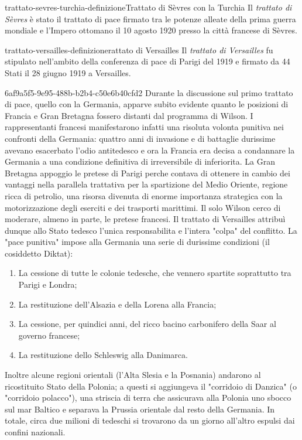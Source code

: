 \documentclass[preview]{standalone}
\begin{document}
\begin{snippetdefinition}{trattato-sevres-turchia-definizione}{Trattato di Sèvres con la Turchia}
    Il \textit{trattato di Sèvres} è stato il trattato di pace firmato
    tra le potenze alleate della prima guerra mondiale e l'Impero ottomano il
    10 agosto 1920 presso la città francese di Sèvres.
\end{snippetdefinition}

\begin{snippetdefinition}{trattato-versailles-definizione}{rattato di Versailles}
    Il \textit{trattato di Versailles} fu stipulato nell'ambito
    della conferenza di pace di Parigi del 1919 e firmato da 44
    Stati il 28 giugno 1919 a Versailles.
\end{snippetdefinition}

\begin{snippet}{6af9a5f5-9e95-488b-b2b4-c50e6b40cfd2}
    Durante la discussione sul primo trattato di pace, quello con la Germania, apparve subito
    evidente quanto le posizioni di Francia e Gran Bretagna fossero distanti dal programma di
    Wilson. I rappresentanti francesi manifestarono infatti una risoluta volonta punitiva nei
    confronti della Germania: quattro anni di invasione e di battaglie durissime avevano esacerbato
    l'odio antitedesco e ora la Francia era decisa a condannare la Germania a una condizione
    definitiva di irreversibile di inferiorita.
    La Gran Bretagna appoggio le pretese di Parigi perche contava di ottenere in cambio dei
    vantaggi nella parallela trattativa per la spartizione del Medio Oriente, regione ricca di petrolio,
    una risorsa divenuta di enorme importanza strategica con la motorizzazione degli eserciti e dei
    trasporti marittimi. Il solo Wilson cerco di moderare, almeno in parte, le pretese francesi. Il
    trattato di Versailles attribuì dunque allo Stato tedesco l'unica responsabilita e l'intera "colpa"
    del conflitto. La "pace punitiva" impose alla Germania una serie di durissime condizioni (il
    cosiddetto Diktat):
    \begin{enumerate}
        \item La cessione di tutte le colonie tedesche, che vennero spartite soprattutto tra Parigi e
        Londra;
        \item La restituzione dell'Alsazia e della Lorena alla Francia;
        \item La cessione, per quindici anni, del ricco bacino carbonifero della Saar al governo
        francese;
        \item La restituzione dello Schleswig alla Danimarca.
    \end{enumerate}
    Inoltre alcune regioni orientali (l'Alta Slesia e la Posnania) andarono al ricostituito Stato della
    Polonia; a questi si aggiungeva il "corridoio di Danzica" (o "corridoio polacco"), una striscia di
    terra che assicurava alla Polonia uno sbocco sul mar Baltico e separava la Prussia orientale dal
    resto della Germania.
    In totale, circa due milioni di tedeschi si trovarono da un giorno all'altro espulsi dai confini
    nazionali.
    

\end{snippet}
\end{document}
